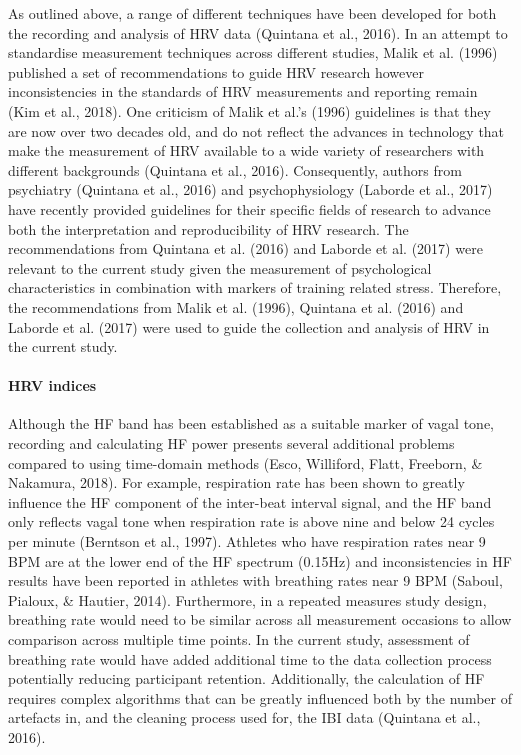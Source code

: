 \documentclass[man,floatsintext]{apa6}
\let\oldparagraph\paragraph
\renewcommand{\paragraph}[1]{\oldparagraph{#1}\mbox{}}
\begin{document}
As outlined above, a range of different techniques have been developed for both the recording and analysis of HRV data (Quintana et al., 2016).
In an attempt to standardise measurement techniques across different studies, Malik et al. (1996) published a set of recommendations to guide HRV research however inconsistencies in the standards of HRV measurements and reporting remain (Kim et al., 2018).
One criticism of Malik et al.'s (1996) guidelines is that they are now over two decades old, and do not reflect the advances in technology that make the measurement of HRV available to a wide variety of researchers with different backgrounds (Quintana et al., 2016).
Consequently, authors from psychiatry (Quintana et al., 2016) and psychophysiology (Laborde et al., 2017) have recently provided guidelines for their specific fields of research to advance both the interpretation and reproducibility of HRV research.
The recommendations from Quintana et al. (2016) and Laborde et al. (2017) were relevant to the current study given the measurement of psychological characteristics in combination with markers of training related stress.
Therefore, the recommendations from Malik et al. (1996), Quintana et al. (2016) and Laborde et al. (2017) were used to guide the collection and analysis of HRV in the current study.

\hypertarget{hrv-indices}{%
\paragraph{HRV indices}\label{hrv-indices}}

Although the HF band has been established as a suitable marker of vagal tone, recording and calculating HF power presents several additional problems compared to using time-domain methods (Esco, Williford, Flatt, Freeborn, \& Nakamura, 2018).
For example, respiration rate has been shown to greatly influence the HF component of the inter-beat interval signal, and the HF band only reflects vagal tone when respiration rate is above nine and below 24 cycles per minute (Berntson et al., 1997).
Athletes who have respiration rates near 9 BPM are at the lower end of the HF spectrum (0.15Hz) and inconsistencies in HF results have been reported in athletes with breathing rates near 9 BPM (Saboul, Pialoux, \& Hautier, 2014).
Furthermore, in a repeated measures study design, breathing rate would need to be similar across all measurement occasions to allow comparison across multiple time points.
In the current study, assessment of breathing rate would have added additional time to the data collection process potentially reducing participant retention.
Additionally, the calculation of HF requires complex algorithms that can be greatly influenced both by the number of artefacts in, and the cleaning process used for, the IBI data (Quintana et al., 2016).
\end{document}
